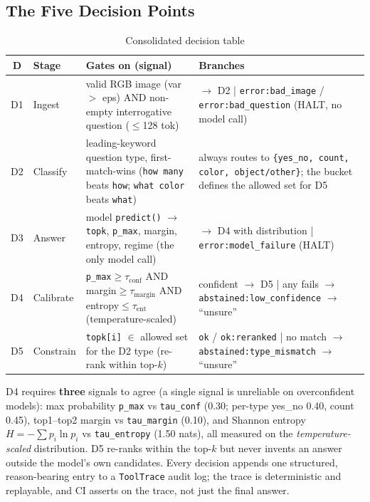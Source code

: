 \documentclass[12pt,a4paper]{article}
\begin{document}
\subsection{The Five Decision Points}

\begin{table}[H]
\centering
\caption{Consolidated decision table}
\small
\setlength{\tabcolsep}{4pt}
\begin{tabularx}{\linewidth}{@{} c p{1.6cm} L L @{}}
\toprule
\textbf{D} & \textbf{Stage} & \textbf{Gates on (signal)} & \textbf{Branches} \\
\midrule
D1 & Ingest & valid RGB image (var $>$ eps) AND non-empty interrogative question ($\leq$128 tok) & $\rightarrow$ D2 \;|\; \texttt{error:bad\_image} / \texttt{error:bad\_question} (HALT, no model call) \\
D2 & Classify & leading-keyword question type, first-match-wins (\texttt{how many} beats \texttt{how}; \texttt{what color} beats \texttt{what}) & always routes to \texttt{\{yes\_no, count, color, object/other\}}; the bucket defines the allowed set for D5 \\
D3 & Answer & model \texttt{predict()} $\rightarrow$ \texttt{topk}, \texttt{p\_max}, margin, entropy, regime (the only model call) & $\rightarrow$ D4 with distribution \;|\; \texttt{error:model\_failure} (HALT) \\
D4 & Calibrate & \texttt{p\_max}$\geq\tau_{\text{conf}}$ AND margin$\geq\tau_{\text{margin}}$ AND entropy$\leq\tau_{\text{ent}}$ (temperature-scaled) & confident $\rightarrow$ D5 \;|\; any fails $\rightarrow$ \texttt{abstained:low\_confidence} $\rightarrow$ ``unsure'' \\
D5 & Constrain & \texttt{topk[i]} $\in$ allowed set for the D2 type (re-rank within top-$k$) & \texttt{ok} / \texttt{ok:reranked} \;|\; no match $\rightarrow$ \texttt{abstained:type\_mismatch} $\rightarrow$ ``unsure'' \\
\bottomrule
\end{tabularx}
\end{table}

D4 requires \textbf{three} signals to agree (a single signal is unreliable on overconfident models): max probability \texttt{p\_max} vs \texttt{tau\_conf} (0.30; per-type yes\_no 0.40, count 0.45), top1--top2 margin vs \texttt{tau\_margin} (0.10), and Shannon entropy $H=-\sum p_i \ln p_i$ vs \texttt{tau\_entropy} (1.50 nats), all measured on the \emph{temperature-scaled} distribution. D5 re-ranks within the top-$k$ but never invents an answer outside the model's own candidates. Every decision appends one structured, reason-bearing entry to a \texttt{ToolTrace} audit log; the trace is deterministic and replayable, and CI asserts on the trace, not just the final answer.
\end{document}
